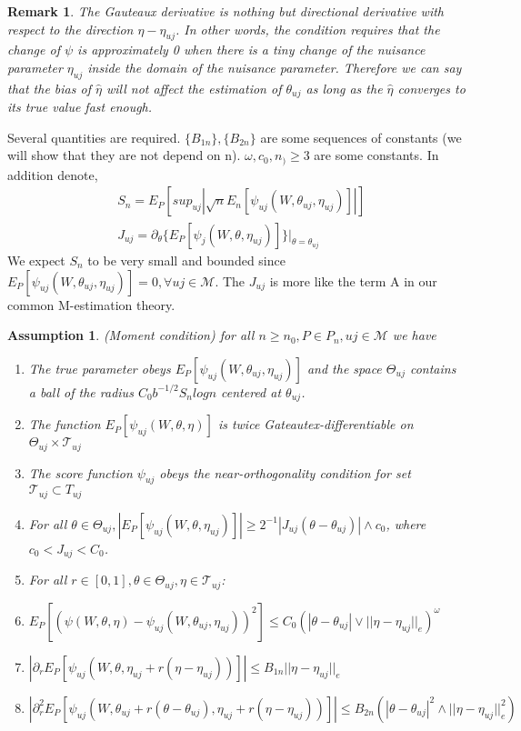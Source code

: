 \documentclass{article}
\newtheorem{remark}[theorem]{Remark}
\newtheorem{assumption}{Assumption}
\begin{document}
\begin{remark}
    The Gauteaux derivative is nothing but directional derivative with respect to the direction $\eta-\eta_{uj}$. In other words, the condition requires that the change of $\psi$ is approximately 0 when there is a tiny change of the nuisance parameter $\eta_{uj}$ inside the domain of the nuisance parameter. Therefore we can say that the bias of $\hat{\eta}$ will not affect the estimation of $\theta_{uj}$ as long as the $\hat{\eta}$ converges to its true value fast enough. 
\end{remark}
Several quantities are required. $\{B_{1n}\},\{B_{2n}\}$ are some sequences of constants (we will show that they are not depend on n). $\omega,c_0, n_)\geq 3$ are some constants. In addition denote,
\begin{align}
    &S_n=E_P[sup_{uj}|\sqrt{n}E_n[\psi_{uj}(W,\theta_{uj},\eta_{uj})]|]\\
    &J_{uj}=\partial_{\theta} \{ E_P [\psi_{j}(W,\theta,\eta_{uj})]\}|_{\theta=\theta_{uj}}
\end{align}
We expect $S_n$ to be very small and bounded since $E_P[\psi_{uj}(W,\theta_{uj},\eta_{uj})]=0,\forall uj\in \mathcal{M}$.
The $J_{uj}$ is more like the term A in our common M-estimation theory. 
\begin{assumption}
    (Moment condition) for all $n\geq n_0, P\in P_n, uj\in\mathcal{M}$ we have 
    \begin{enumerate}
        \item The true parameter obeys $E_P[\psi_{uj}(W,\theta_{uj},\eta_{uj})]$ and the space $\Theta_{uj}$ contains a ball of the radius $C_0 b^{-1/2} S_nlogn$ centered at $\theta_{uj}$. 
        \item The function $E_P[\psi_{uj}(W,\theta,\eta)]$ is twice Gateautex-differentiable on $\Theta_{uj}\times \mathcal{T}_{uj}$ 
        \item The score function $\psi_{uj}$ obeys the near-orthogonality condition for set $\mathcal{T}_{uj}\subset T_{uj}$
        \item For all $\theta\in \Theta_{uj},|E_P[\psi_{uj}(W,\theta,\eta_{uj})]|\geq 2^{-1}|J_{uj}(\theta-\theta_{uj})|\wedge c_0$, where $c_0<J_{uj}<C_0$.
        \item For all $r \in [0,1], \theta\in \Theta_{uj},\eta\in \mathcal{T}_{uj}$:
        \item[(a)] $E_P[(\psi(W,\theta,\eta)-\psi_{uj}(W,\theta_{uj},\eta_{uj}))^2]\leq C_0(|\theta-\theta_{uj}|\vee ||\eta-\eta_{uj}||_e)^\omega$
        \item[(b)] $|\partial_r E_P[\psi_{uj}(W,\theta,\eta_{uj}+r(\eta-\eta_{uj}))]|\leq B_{1n}||\eta-\eta_{uj}||_e$
        \item[(c)] $|\partial_r^2 E_P[\psi_{uj}(W,\theta_{uj}+r(\theta-\theta_{uj}),\eta_{uj}+r(\eta-\eta_{uj}))]|\leq B_{2n}(|\theta-\theta_{uj}|^2\wedge ||\eta-\eta_{uj}||_e^2)$
    \end{enumerate}
\end{assumption}
\end{document}
